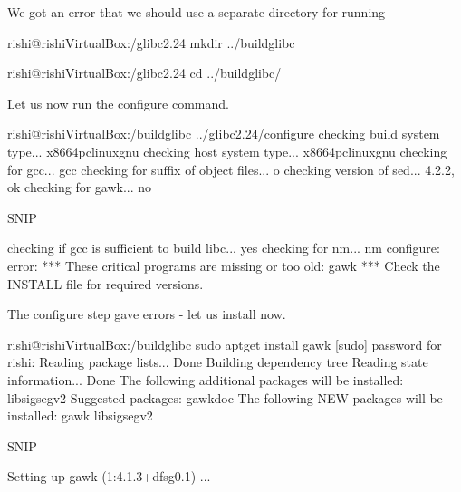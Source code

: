 \documentclass[letterpaper,10pt,english]{sphinxmanual}
\begin{document}
We got an error that we should use a separate directory for running 

\begin{sphinxVerbatim}[commandchars=\\\{\}]
rishi@rishi\PYGZhy{}VirtualBox:\PYGZti{}/glibc\PYGZhy{}2.24\PYGZdl{} mkdir ../build\PYGZus{}glibc

rishi@rishi\PYGZhy{}VirtualBox:\PYGZti{}/glibc\PYGZhy{}2.24\PYGZdl{} cd ../build\PYGZus{}glibc/
\end{sphinxVerbatim}

Let us now run the configure command.

\begin{sphinxVerbatim}[commandchars=\\\{\}]
rishi@rishi\PYGZhy{}VirtualBox:\PYGZti{}/build\PYGZus{}glibc\PYGZdl{} ../glibc\PYGZhy{}2.24/configure
checking build system type... x86\PYGZus{}64\PYGZhy{}pc\PYGZhy{}linux\PYGZhy{}gnu
checking host system type... x86\PYGZus{}64\PYGZhy{}pc\PYGZhy{}linux\PYGZhy{}gnu
checking for gcc... gcc
checking for suffix of object files... o
checking version of sed... 4.2.2, ok
checking for gawk... no

\PYGZgt{}\PYGZgt{}\PYGZgt{}\PYGZgt{}\PYGZgt{}\PYGZgt{}\PYGZgt{}\PYGZgt{}\PYGZgt{}\PYGZgt{}\PYGZgt{}\PYGZgt{}\PYGZgt{}\PYGZgt{}\PYGZgt{}\PYGZgt{}\PYGZgt{}SNIP\PYGZlt{}\PYGZlt{}\PYGZlt{}\PYGZlt{}\PYGZlt{}\PYGZlt{}\PYGZlt{}\PYGZlt{}\PYGZlt{}\PYGZlt{}\PYGZlt{}\PYGZlt{}\PYGZlt{}\PYGZlt{}\PYGZlt{}\PYGZlt{}\PYGZlt{}\PYGZlt{}\PYGZlt{}\PYGZlt{}\PYGZlt{}\PYGZlt{}

checking if gcc is sufficient to build libc... yes
checking for nm... nm
configure: error:
*** These critical programs are missing or too old: gawk
*** Check the INSTALL file for required versions.
\end{sphinxVerbatim}

The configure step gave errors - let us install  now.

\begin{sphinxVerbatim}[commandchars=\\\{\}]
rishi@rishi\PYGZhy{}VirtualBox:\PYGZti{}/build\PYGZus{}glibc\PYGZdl{} sudo apt\PYGZhy{}get install gawk
[sudo] password for rishi:
Reading package lists... Done
Building dependency tree
Reading state information... Done
The following additional packages will be installed:
libsigsegv2
Suggested packages:
gawk\PYGZhy{}doc
The following NEW packages will be installed:
gawk libsigsegv2

\PYGZgt{}\PYGZgt{}\PYGZgt{}\PYGZgt{}\PYGZgt{}\PYGZgt{}\PYGZgt{}\PYGZgt{}\PYGZgt{}\PYGZgt{}\PYGZgt{}\PYGZgt{}\PYGZgt{}SNIP\PYGZlt{}\PYGZlt{}\PYGZlt{}\PYGZlt{}\PYGZlt{}\PYGZlt{}\PYGZlt{}\PYGZlt{}\PYGZlt{}\PYGZlt{}\PYGZlt{}\PYGZlt{}\PYGZlt{}\PYGZlt{}

Setting up gawk (1:4.1.3+dfsg\PYGZhy{}0.1) ...
\end{sphinxVerbatim}
\end{document}
